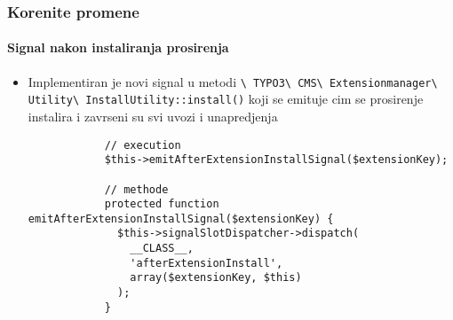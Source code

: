 \begin{frame}[fragile]
	\frametitle{Korenite promene}
	\framesubtitle{Signal nakon instaliranja prosirenja}

	\lstset{basicstyle=\tiny\ttfamily}

	\begin{itemize}

		\item Implementiran je novi signal u metodi
			\smaller
				\texttt{\textbackslash
					TYPO3\textbackslash
					CMS\textbackslash
					Extensionmanager\textbackslash
					Utility\textbackslash
					InstallUtility::install()}
			\normalsize
			koji se emituje cim se prosirenje instalira i zavrseni su svi uvozi i unapredjenja

		\begin{lstlisting}
			// execution
			$this->emitAfterExtensionInstallSignal($extensionKey);

			// methode
			protected function emitAfterExtensionInstallSignal($extensionKey) {
			  $this->signalSlotDispatcher->dispatch(
			    __CLASS__,
			    'afterExtensionInstall',
			    array($extensionKey, $this)
			  );
			}
		\end{lstlisting}

	\end{itemize}

\end{frame}

